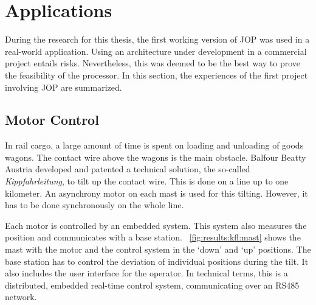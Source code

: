 %


\section{Applications}
\label{sec:applications}

During the research for this thesis, the first working version of
JOP was used in a real-world application. Using an architecture
under development in a commercial project entails risks.
Nevertheless, this was deemed to be the best way to prove the
feasibility of the processor. In this section, the experiences of
the first project involving JOP are summarized.

\subsection{Motor Control}
\label{sec:app:kfl}

In rail cargo, a large amount of time is spent on loading and
unloading of goods wagons. The contact wire above the wagons is the
main obstacle. Balfour Beatty Austria developed and patented a
technical solution, the so-called \emph{Kippfahrleitung}, to tilt
up the contact wire. This is done on a line up to one kilometer. An
asynchrony motor on each mast is used for this tilting. However, it
has to be done synchronously on the whole line.

Each motor is controlled by an embedded system. This system also
measures the position and communicates with a base station.
\figurename~\ref{fig:results:kfl:mast} shows the mast with the motor
and the control system in the `down' and `up' positions. The base
station has to control the deviation of individual positions during
the tilt. It also includes the user interface for the operator. In
technical terms, this is a distributed, embedded real-time control
system, communicating over an RS485 network.

